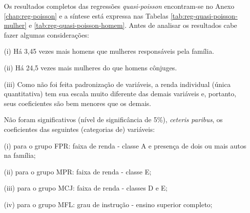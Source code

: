 
Os resultados completos das regressões \textit{quasi-poisson} encontram-se no Anexo \ref{chap:reg-poisson} e a síntese está expressa nas Tabelas 
\ref{tab:reg-quasi-poisson-mulher} e \ref{tab:reg-quasi-poisson-homem}.
Antes de analisar os resultados cabe fazer algumas considerações:
\begin{compactitem}[]
\item (i) Há 3,45 vezes mais homens que mulheres responsáveis pela família.
\item (ii) Há 24,5 vezes mais mulheres do que homens cônjuges.
\item (iii) Como não foi feita padronização de variáveis, a renda individual (única quantitativa) tem sua escala muito diferente das demais variáveis e, portanto, seus coeficientes são bem menores que os demais.
\end{compactitem}

Não foram significativos (nível de significância de 5\%), \textit{ceteris paribus}, os coeficientes das seguintes (categorias de) variáveis:
\begin{compactitem}[]
\item (i) para o grupo FPR: faixa de renda - classe A e presença de dois ou mais autos na família;
\item (ii) para o grupo MPR: faixa de renda - classe E;
\item (iii) para o grupo MCJ: faixa de renda - classes D e E;
\item (iv) para o grupo MFL: grau de instrução - ensino superior completo;
\end{compactitem}

